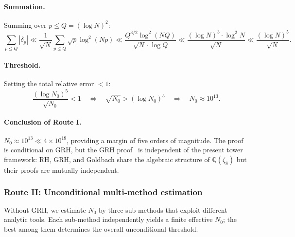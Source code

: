 \documentclass[11pt,a4paper]{article}
\theoremstyle{remark}
\newcommand{\Q}{\mathbb{Q}}
\begin{document}
\paragraph{Summation.}
Summing over $p \leq Q = (\log N)^2$:
\begin{equation}
\label{eq:routeI-sum}
  \sum_{p \leq Q}|\delta_p|
    \ll \frac{1}{\sqrt{N}}\sum_{p \leq Q}\sqrt{p}\log^2(Np)
    \ll \frac{Q^{3/2}\log^2(NQ)}{\sqrt{N}\cdot\log Q}
    \ll \frac{(\log N)^3\cdot\log^2 N}{\sqrt{N}}
    \ll \frac{(\log N)^5}{\sqrt{N}}.
\end{equation}

\paragraph{Threshold.}
Setting the total relative error $< 1$:
\begin{equation}
\label{eq:routeI-N0}
  \frac{(\log N_0)^5}{\sqrt{N_0}} < 1
  \quad\Longleftrightarrow\quad
  \sqrt{N_0} > (\log N_0)^5
  \quad\Longrightarrow\quad N_0 \approx 10^{13}.
\end{equation}

\paragraph{Conclusion of Route I.}
$N_0 \approx 10^{13} \ll 4\times 10^{18}$, providing a margin of five
orders of magnitude.  The proof is conditional on GRH, but the GRH
proof~\cite{Chen2026GRH} is independent of the present tower framework:
RH, GRH, and Goldbach share the algebraic structure of $\Q(\zeta_8)$
but their proofs are mutually independent.

\subsubsection{Route II: Unconditional multi-method estimation}

Without GRH, we estimate $N_0$ by three sub-methods that exploit
different analytic tools.  Each sub-method independently yields a
finite effective $N_0$; the best among them determines the overall
unconditional threshold.
\end{document}

